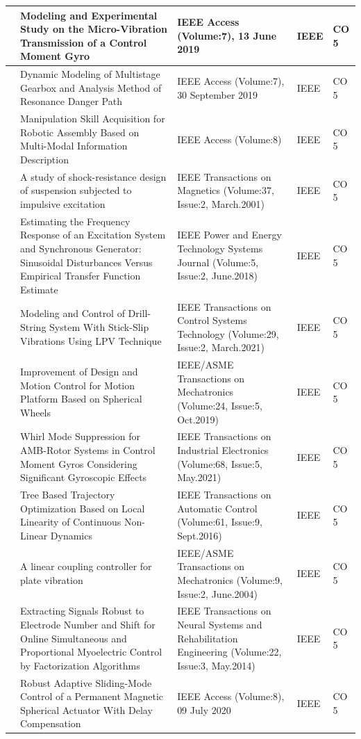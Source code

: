 \documentclass[11pt,paper=a4,answers]{exam}
\begin{document}
\begin{flushleft}
\begin{longtable}{|>{\centering\arraybackslash}p{1.4cm}  |  >{\raggedright\arraybackslash}p{6cm} |>{\centering\arraybackslash}p{3.75cm}|>{\centering\arraybackslash}p{2cm} |>{\centering\arraybackslash}p{2cm} |}
75&Modeling and Experimental Study on the Micro-Vibration Transmission of a Control Moment Gyro&IEEE Access (Volume:7), 13 June 2019&IEEE&CO 5\\\hline
76&Dynamic Modeling of Multistage Gearbox and Analysis Method of Resonance Danger Path&IEEE Access (Volume:7), 30 September 2019&IEEE&CO 5\\\hline
77&Manipulation Skill Acquisition for Robotic Assembly Based on Multi-Modal Information Description&IEEE Access (Volume:8) &IEEE&CO 5\\\hline
78&A study of shock-resistance design of suspension subjected to impulsive excitation&IEEE Transactions on Magnetics (Volume:37, Issue:2, March.2001)&IEEE&CO 5\\\hline
79&Estimating the Frequency Response of an Excitation System and Synchronous Generator: Sinusoidal Disturbances Versus Empirical Transfer Function Estimate&IEEE Power and Energy Technology Systems Journal (Volume:5, Issue:2, June.2018)&IEEE&CO 5\\\hline
80&Modeling and Control of Drill-String System With Stick-Slip Vibrations Using LPV Technique&IEEE Transactions on Control Systems Technology (Volume:29, Issue:2, March.2021)&IEEE&CO 5\\\hline
81&Improvement of Design and Motion Control for Motion Platform Based on Spherical Wheels&IEEE/ASME Transactions on Mechatronics (Volume:24, Issue:5, Oct.2019)&IEEE&CO 5\\\hline
82&Whirl Mode Suppression for AMB-Rotor Systems in Control Moment Gyros Considering Significant Gyroscopic Effects&IEEE Transactions on Industrial Electronics (Volume:68, Issue:5, May.2021)&IEEE&CO 5\\\hline
83&Tree Based Trajectory Optimization Based on Local Linearity of Continuous Non-Linear Dynamics&IEEE Transactions on Automatic Control (Volume:61, Issue:9, Sept.2016)&IEEE&CO 5\\\hline
84&A linear coupling controller for plate vibration&IEEE/ASME Transactions on Mechatronics (Volume:9, Issue:2, June.2004)&IEEE&CO 5\\\hline
85&Extracting Signals Robust to Electrode Number and Shift for Online Simultaneous and Proportional Myoelectric Control by Factorization Algorithms&IEEE Transactions on Neural Systems and Rehabilitation Engineering (Volume:22, Issue:3, May.2014)&IEEE&CO 5\\\hline
86&Robust Adaptive Sliding-Mode Control of a Permanent Magnetic Spherical Actuator With Delay Compensation&IEEE Access (Volume:8), 09 July 2020&IEEE&CO 5\\\hline

\end{longtable}
\end{flushleft}
\end{document}
